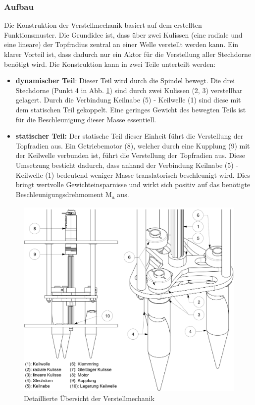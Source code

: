 \subsubsection{Aufbau}
Die Konstruktion der Verstellmechanik basiert auf dem erstellten Funktionsmuster. Die Grundidee ist, dass über zwei Kulissen (eine radiale und eine lineare) der Topfradius zentral an einer Welle verstellt werden kann. Ein klarer Vorteil ist, dass dadurch nur ein Aktor für die Verstellung aller Stechdorne benötigt wird. Die Konstruktion kann in zwei Teile unterteilt werden:
\begin{itemize}
	\item \textbf{dynamischer Teil}: Dieser Teil wird durch die Spindel bewegt. Die drei Stechdorne (Punkt 4 in Abb. \ref{fig:details_vm}) sind durch zwei Kulissen (2, 3) verstellbar gelagert. Durch die Verbindung Keilnabe (5) - Keilwelle (1) sind diese mit dem statischen Teil gekoppelt. Eine geringes Gewicht des bewegten Teils ist für die Beschleunigung dieser Masse essentiell.
	
	\item \textbf{statischer Teil:} Der statische Teil dieser Einheit führt die Verstellung der Topfradien aus. Ein Getriebemotor (8), welcher durch eine Kupplung (9) mit der Keilwelle verbunden ist, führt die Verstellung der Topfradien aus. Diese Umsetzung besticht dadurch, dass anhand der Verbindung Keilnabe (5) - Keilwelle (1) bedeutend weniger Masse translatorisch beschleunigt wird. Dies bringt wertvolle Gewichteinsparnisse und wirkt sich positiv auf das benötigte Beschleunigungsdrehmoment M\textsubscript{a} aus.
\end{itemize}
	\begin{figure}[H]
	\includegraphics[scale=0.6]{Illustrationen/6-Umsetzung/details_vm.jpg}
	\caption{Detaillierte Übersicht der Verstellmechanik}
	\label{fig:details_vm}
	\end{figure}
